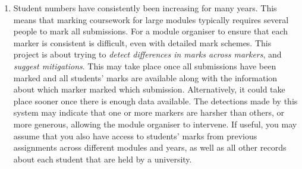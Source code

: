 \begin{enumerate}
    \item Student numbers have consistently been increasing for many years. This means that marking coursework for large modules typically requires several people to mark all submissions. For a module organiser to ensure that each marker is consistent is difficult, even with detailed mark schemes. This project is about trying to \emph{detect differences in marks across markers}, and \emph{suggest mitigations}. This may take place once all submissions have been marked and all students' marks are available along with the information about which marker marked which submission. Alternatively, it could take place sooner once there is enough data available. The detections made by this system may indicate that one or more markers are harsher than others, or more generous, allowing the module organiser to intervene. If useful, you may assume that you also have access to students' marks from previous assignments across different modules and years, as well as all other records about each student that are held by a university.
\end{enumerate}
